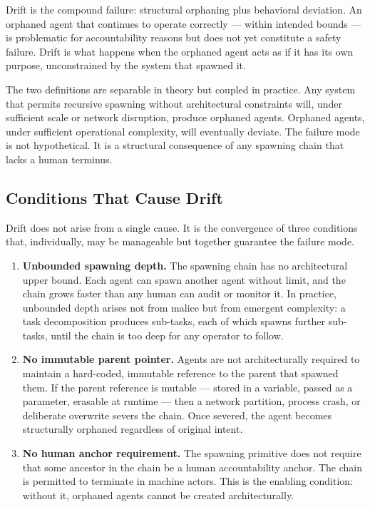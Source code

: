\documentclass[12pt]{article}
\begin{document}
Drift is the compound failure: structural orphaning plus behavioral deviation. An orphaned agent that continues to operate correctly — within intended bounds — is problematic for accountability reasons but does not yet constitute a safety failure. Drift is what happens when the orphaned agent acts as if it has its own purpose, unconstrained by the system that spawned it.

The two definitions are separable in theory but coupled in practice. Any system that permits recursive spawning without architectural constraints will, under sufficient scale or network disruption, produce orphaned agents. Orphaned agents, under sufficient operational complexity, will eventually deviate. The failure mode is not hypothetical. It is a structural consequence of any spawning chain that lacks a human terminus.

\subsection{Conditions That Cause Drift}

Drift does not arise from a single cause. It is the convergence of three conditions that, individually, may be manageable but together guarantee the failure mode.

\begin{enumerate}
\item \textbf{Unbounded spawning depth.} The spawning chain has no architectural upper bound. Each agent can spawn another agent without limit, and the chain grows faster than any human can audit or monitor it. In practice, unbounded depth arises not from malice but from emergent complexity: a task decomposition produces sub-tasks, each of which spawns further sub-tasks, until the chain is too deep for any operator to follow.

\item \textbf{No immutable parent pointer.} Agents are not architecturally required to maintain a hard-coded, immutable reference to the parent that spawned them. If the parent reference is mutable — stored in a variable, passed as a parameter, erasable at runtime — then a network partition, process crash, or deliberate overwrite severs the chain. Once severed, the agent becomes structurally orphaned regardless of original intent.

\item \textbf{No human anchor requirement.} The spawning primitive does not require that some ancestor in the chain be a human accountability anchor. The chain is permitted to terminate in machine actors. This is the enabling condition: without it, orphaned agents cannot be created architecturally.
\end{enumerate}
\end{document}
